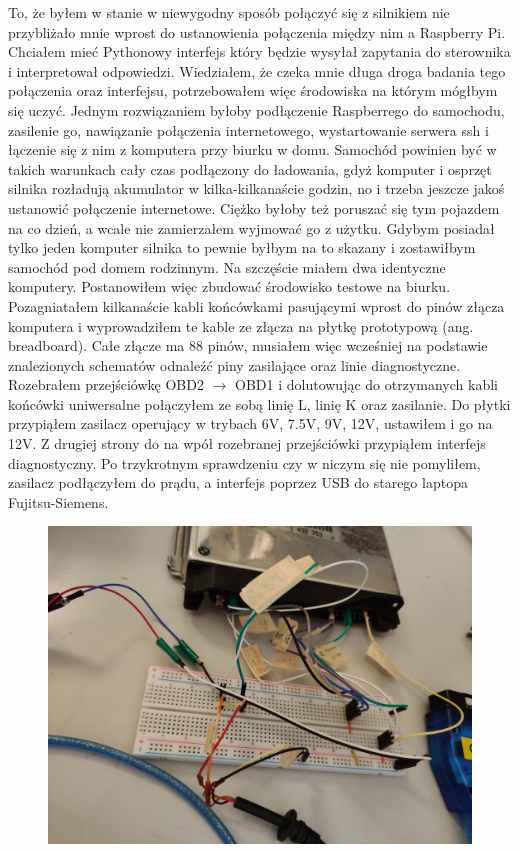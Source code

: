 \documentclass[declaration,shortabstract, inz]{iithesis}
\begin{document}
    To, że byłem w stanie w niewygodny sposób połączyć się z silnikiem nie przybliżało mnie wprost do ustanowienia połączenia między nim a Raspberry Pi.
    Chciałem mieć Pythonowy interfejs który będzie wysyłał zapytania do sterownika i interpretował odpowiedzi. Wiedziałem, że czeka mnie długa droga badania tego połączenia oraz interfejsu, potrzebowałem więc środowiska na którym mógłbym się uczyć. Jednym rozwiązaniem byłoby podłączenie Raspberrego do samochodu, zasilenie go, nawiązanie połączenia internetowego, wystartowanie serwera ssh i łączenie się z nim z komputera przy biurku w domu. Samochód powinien być w takich warunkach cały czas podłączony do ładowania, gdyż komputer i osprzęt silnika rozładują akumulator w kilka-kilkanaście godzin, no i trzeba jeszcze jakoś ustanowić połączenie internetowe. Ciężko byłoby też poruszać się tym pojazdem na co dzień, a wcale nie zamierzałem wyjmować go z użytku. Gdybym posiadał tylko jeden komputer silnika to pewnie byłbym na to skazany i zostawiłbym samochód pod domem rodzinnym. Na szczęście miałem dwa identyczne komputery. Postanowiłem więc zbudować środowisko testowe na biurku. Pozagniatałem kilkanaście kabli końcówkami pasującymi wprost do pinów złącza komputera i wyprowadziłem te kable ze złącza na płytkę prototypową (ang. breadboard). Całe złącze ma 88 pinów, musiałem więc wcześniej na podstawie znalezionych schematów odnaleźć piny zasilające oraz linie diagnostyczne. Rozebrałem przejściówkę OBD2 $\rightarrow$ OBD1 i dolutowując do otrzymanych kabli końcówki uniwersalne połączyłem ze sobą linię L, linię K oraz zasilanie. Do płytki przypiąłem zasilacz operujący w trybach 6V, 7.5V, 9V, 12V, ustawiłem i go na 12V. Z drugiej strony do na wpół rozebranej przejściówki przypiąłem interfejs diagnostyczny. Po trzykrotnym sprawdzeniu czy w niczym się nie pomyliłem, zasilacz podłączyłem do prądu, a interfejs poprzez USB do starego laptopa Fujitsu-Siemens.
    
    \begin{figure}[htp]
        \centering
        \includegraphics[width=12cm]{images/test_setup_close.jpg}
        \label{fig:test_setup_close}
    \end{figure}
    \FloatBarrier
    
\end{document}
